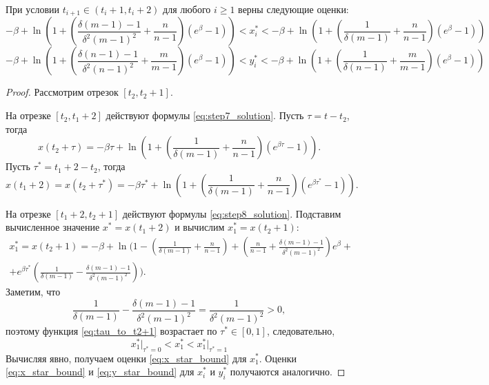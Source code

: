 \begin{lemma}
	\label{lm:xy_star_bounds}
	При условии $t_{i + 1} \in (t_i + 1, t_i + 2)$ для любого $i \geqslant 1$ верны следующие оценки:
	\footnotesize
	\begin{equation}
		\label{eq:x_star_bound}
		-\beta + \ln\left(1 + \left( \frac{\delta(m - 1) - 1}{\delta^2 (m - 1)^2} + \dfrac{n}{n - 1} \right)(e^{\beta} - 1) \right) < x^*_i < -\beta + \ln\left(1 + \left( \dfrac{1}{\delta(m - 1)} + \dfrac{n}{n - 1} \right)(e^{\beta} - 1) \right)
	\end{equation}
	\begin{equation}
		\label{eq:y_star_bound}
		-\beta + \ln\left(1 + \left( \frac{\delta(n - 1) - 1}{\delta^2 (n - 1)^2} + \dfrac{m}{m - 1} \right)(e^{\beta} - 1) \right) < y^*_i < -\beta + \ln\left(1 + \left( \dfrac{1}{\delta(n - 1)} + \dfrac{m}{m - 1} \right)(e^{\beta} - 1) \right)
	\end{equation}
	\normalsize
\end{lemma}
\begin{proof}
	Рассмотрим отрезок $[t_2, t_2 + 1]$.
	
	На отрезке $[t_2, t_1 + 2]$ действуют формулы \eqref{eq:step7_solution}. Пусть $\tau = t - t_2$, тогда
	\[
	x(t_2 + \tau) = - \beta \tau + \ln\left( 1 + \left(\dfrac{1}{\delta(m - 1)} + \dfrac{n}{n - 1}\right) (e^{\beta \tau} - 1) \right).
	\]
	Пусть $\tau^* = t_1 + 2 - t_2$, тогда
	\[
	x(t_1 + 2) = x(t_2 + \tau^*) = -\beta \tau^* + \ln\left( 1 + \left(\dfrac{1}{\delta(m - 1)} + \dfrac{n}{n - 1}\right) (e^{\beta \tau^*} - 1) \right).
	\]
	
	На отрезке $[t_1 + 2, t_2 + 1]$ действуют формулы \eqref{eq:step8_solution}. Подставим вычисленное значение $x^* = x(t_1 + 2)$ и вычислим $x^*_1 = x(t_2 + 1)$:
	\begin{multline}
		\label{eq:tau_to_t2+1}
		x^*_1 = x(t_2 + 1) = -\beta + \ln\Bigg( 1 - \left(\frac{1}{\delta(m - 1)} + \frac{n}{n - 1}\right) + \left(\frac{n}{n - 1} + \frac{\delta(m - 1) - 1}{\delta^2 (m - 1)^2}\right) e^{\beta} + \\ + e^{\beta \tau^*} \left(\frac{1}{\delta(m - 1)} - \frac{\delta(m - 1) - 1}{\delta^2 (m - 1)^2}\right) \Bigg).
	\end{multline}
	Заметим, что 
	\[
	\frac{1}{\delta(m - 1)} - \frac{\delta(m - 1) - 1}{\delta^2 (m - 1)^2} = \frac{1}{\delta^2 (m - 1)^2} > 0,
	\]
	поэтому функция \eqref{eq:tau_to_t2+1} возрастает по $\tau^* \in [0, 1]$, следовательно, 
	\[
	x^*_1 \vert_{\tau^* = 0} < x^*_1 < x^*_1 \vert_{\tau^* = 1}
	\]
	Вычисляя явно, получаем оценки \eqref{eq:x_star_bound} для $x_1^*$. Оценки \eqref{eq:x_star_bound} и \eqref{eq:y_star_bound} для $x_i^*$ и $y_i^*$ получаются аналогично. 
	
\end{proof}

